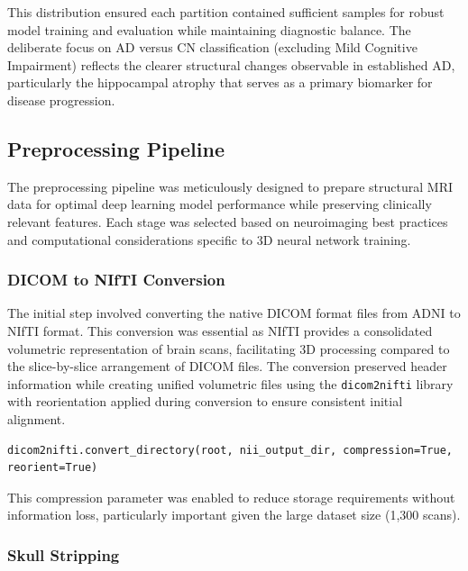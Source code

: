 \documentclass[12pt, a4paper]{article}
\begin{document}
This distribution ensured each partition contained sufficient samples for robust model training and evaluation while maintaining diagnostic balance. The deliberate focus on AD versus CN classification (excluding Mild Cognitive Impairment) reflects the clearer structural changes observable in established AD, particularly the hippocampal atrophy that serves as a primary biomarker for disease progression.

\subsection{Preprocessing Pipeline}

The preprocessing pipeline was meticulously designed to prepare structural MRI data for optimal deep learning model performance while preserving clinically relevant features. Each stage was selected based on neuroimaging best practices and computational considerations specific to 3D neural network training.

\subsubsection{DICOM to NIfTI Conversion}

The initial step involved converting the native DICOM format files from ADNI to NIfTI format. This conversion was essential as NIfTI provides a consolidated volumetric representation of brain scans, facilitating 3D processing compared to the slice-by-slice arrangement of DICOM files. The conversion preserved header information while creating unified volumetric files using the \texttt{dicom2nifti} library with reorientation applied during conversion to ensure consistent initial alignment.

\begin{verbatim}
dicom2nifti.convert_directory(root, nii_output_dir, compression=True, reorient=True)
\end{verbatim}

This compression parameter was enabled to reduce storage requirements without information loss, particularly important given the large dataset size (1,300 scans).

\subsubsection{Skull Stripping}
\end{document}
